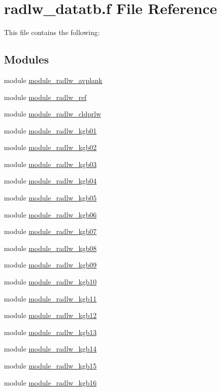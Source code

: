 \hypertarget{radlw__datatb_8f}{}\section{radlw\+\_\+datatb.\+f File Reference}
\label{radlw__datatb_8f}


This file contains the following\+:  


\subsection*{Modules}
\begin{DoxyCompactItemize}
\item 
module \hyperlink{namespacemodule__radlw__avplank}{module\+\_\+radlw\+\_\+avplank}
\item 
module \hyperlink{namespacemodule__radlw__ref}{module\+\_\+radlw\+\_\+ref}
\item 
module \hyperlink{namespacemodule__radlw__cldprlw}{module\+\_\+radlw\+\_\+cldprlw}
\item 
module \hyperlink{namespacemodule__radlw__kgb01}{module\+\_\+radlw\+\_\+kgb01}
\item 
module \hyperlink{namespacemodule__radlw__kgb02}{module\+\_\+radlw\+\_\+kgb02}
\item 
module \hyperlink{namespacemodule__radlw__kgb03}{module\+\_\+radlw\+\_\+kgb03}
\item 
module \hyperlink{namespacemodule__radlw__kgb04}{module\+\_\+radlw\+\_\+kgb04}
\item 
module \hyperlink{namespacemodule__radlw__kgb05}{module\+\_\+radlw\+\_\+kgb05}
\item 
module \hyperlink{namespacemodule__radlw__kgb06}{module\+\_\+radlw\+\_\+kgb06}
\item 
module \hyperlink{namespacemodule__radlw__kgb07}{module\+\_\+radlw\+\_\+kgb07}
\item 
module \hyperlink{namespacemodule__radlw__kgb08}{module\+\_\+radlw\+\_\+kgb08}
\item 
module \hyperlink{namespacemodule__radlw__kgb09}{module\+\_\+radlw\+\_\+kgb09}
\item 
module \hyperlink{namespacemodule__radlw__kgb10}{module\+\_\+radlw\+\_\+kgb10}
\item 
module \hyperlink{namespacemodule__radlw__kgb11}{module\+\_\+radlw\+\_\+kgb11}
\item 
module \hyperlink{namespacemodule__radlw__kgb12}{module\+\_\+radlw\+\_\+kgb12}
\item 
module \hyperlink{namespacemodule__radlw__kgb13}{module\+\_\+radlw\+\_\+kgb13}
\item 
module \hyperlink{namespacemodule__radlw__kgb14}{module\+\_\+radlw\+\_\+kgb14}
\item 
module \hyperlink{namespacemodule__radlw__kgb15}{module\+\_\+radlw\+\_\+kgb15}
\item 
module \hyperlink{namespacemodule__radlw__kgb16}{module\+\_\+radlw\+\_\+kgb16}
\end{DoxyCompactItemize}
